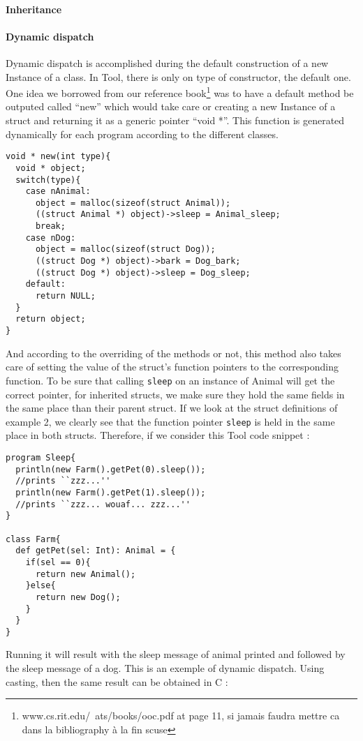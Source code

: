 \paragraph{Inheritance}

\paragraph{Dynamic dispatch}
Dynamic dispatch is accomplished during the default construction of a new Instance of a class.
In Tool, there is only on type of constructor, the default one.
One idea we borrowed from our reference book\footnote{www.cs.rit.edu/~ats/books/ooc.pdf at page 11, si jamais faudra mettre ca dans la bibliography à la fin scuse} was to have a default method be outputed called ``new'' which would take care or creating a new Instance of a struct and returning it as a generic pointer ``void *''. This function is generated dynamically for each program according to the different classes.
\begin{lstlisting}
void * new(int type){
  void * object;
  switch(type){
    case nAnimal:
      object = malloc(sizeof(struct Animal));
      ((struct Animal *) object)->sleep = Animal_sleep;
      break;
    case nDog:
      object = malloc(sizeof(struct Dog));
      ((struct Dog *) object)->bark = Dog_bark;
      ((struct Dog *) object)->sleep = Dog_sleep;
    default:
      return NULL;
  }
  return object;
}
\end{lstlisting}
And according to the overriding of the methods or not, this method also takes care of setting the value of the struct's function pointers to the corresponding function. To be sure that calling {\lstinline[basicstyle=\small\ttfamily]|sleep|} on an instance of Animal will get the correct pointer, for inherited structs, we make sure they hold the same fields in the same place than their parent struct. If we look at the struct definitions of example 2, we clearly see that the function pointer {\lstinline[basicstyle=\small\ttfamily]|sleep|} is held in the same place in both structs. Therefore, if we consider this Tool code snippet :

\lstset{style=customtool}
\begin{lstlisting}
program Sleep{
  println(new Farm().getPet(0).sleep());
  //prints ``zzz...''
  println(new Farm().getPet(1).sleep());
  //prints ``zzz... wouaf... zzz...''
}

class Farm{
  def getPet(sel: Int): Animal = {
    if(sel == 0){
      return new Animal();
    }else{
      return new Dog();
    }
  }
}
\end{lstlisting}
Running it will result with the sleep message of animal printed and followed by the sleep message of a dog. This is an exemple of dynamic dispatch. Using casting, then the same result can be obtained in C :

